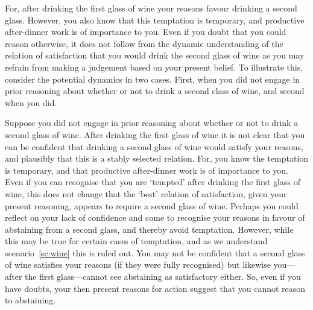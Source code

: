 \documentclass[10pt]{article}
\begin{document}
For, after drinking the first glass of wine your reasons favour drinking a second glass.
However, you also know that this temptation is temporary, and productive after-dinner work is of importance to you.
Even if you doubt that you could reason otherwise, it does not follow from the dynamic understanding of the relation of satisfaction that you would drink the second glass of wine as you may refrain from making a judgement based on your present belief.
To illustrate this, consider the potential dynamics in two cases.
First, when you did not engage in prior reasoning about whether or not to drink a second class of wine, and second when you did.

Suppose you did not engage in prior reasoning about whether or not to drink a second glass of wine.
After drinking the first glass of wine it is not clear that you can be confident that drinking a second glass of wine would satisfy your reasons, and plausibly that this is a stably selected relation.
For, you know the temptation is temporary, and that productive after-dinner work is of importance to you.
Even if you can recognise that you are `tempted' after drinking the first glass of wine, this does not change that the `best' relation of satisfaction, given your present reasoning, appears to require a second glass of wine.
Perhaps you could reflect on your lack of confidence and come to recognise your reasons in favour of abstaining from a second glass, and thereby avoid temptation.
However, while this may be true for certain cases of temptation, and as we understand scenario~\ref{sc:wine} this is ruled out.
You may not be confident that a second glass of wine satisfies your reasons (if they were fully recognised) but likewise you---after the first glass---cannot see abstaining as satisfactory either.
So, even if you have doubts, your then present reasons for action suggest that you cannot reason to abstaining.
\end{document}
